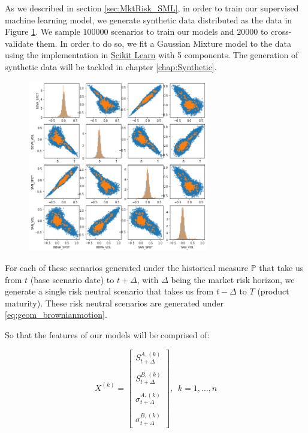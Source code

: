 As we described in section \ref{sec:MktRisk_SML}, in order to train our supervised machine learning model, we generate synthetic data distributed as the data in Figure \ref{fig:distrib_P}. We sample $100000$ scenarios to train our models and $20000$ to cross-validate them. In order to do so, we  fit a Gaussian Mixture model to the data using the implementation in \href{https://scikit-learn.org/stable/modules/generated/sklearn.mixture.GaussianMixture.html}{Scikit Learn} with 5 components. The generation of synthetic data will be tackled in chapter \ref{chap:Synthetic}.


\begin{figure}[h] 
\centering
\includegraphics[width=0.7\textwidth]{Figures/MarketRisk/GaussMixture.png}
\caption{}
\label{fig:distrib_P}
\end{figure}

For each of these scenarios generated under the historical measure $\mathbb{P}$ that take us from $t$ (base scenario date) to $t+\Delta$, with $\Delta$ being the market risk horizon, we generate a single risk neutral scenario that takes us from $t-\Delta$ to $T$ (product maturity). These risk neutral scenarios are generated under \ref{eq:geom_brownianmotion}. 

So that the features of our models will be comprised of:

$$
X^{(k)}=\left[\begin{array}{c}
S_{t+\Delta}^{A,(k)} \\ \\
S_{t+\Delta}^{B,(k)} \\ \\
\sigma_{t+\Delta}^{A,(k)} \\ \\
\sigma_{t+\Delta}^{B,(k)}
\end{array}\right], \ \  k=1, \ldots, n
$$

